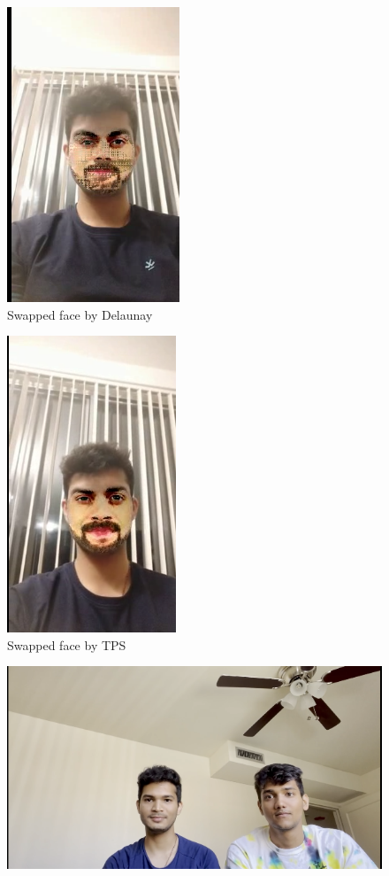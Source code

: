 \documentclass[conference]{IEEEtran}
\begin{document}
\begin{enumerate}
\begin{figure}[H]
\includegraphics[scale=0.4]{dt11.png}
\centering
\caption{Swapped face by Delaunay}
\end{figure}
\begin{figure}[H]
\includegraphics[scale=0.4]{tps1.png}
\centering
\caption{Swapped face by TPS}
\end{figure}
\begin{figure}[H]
\includegraphics[scale=0.4]{tps2.png}

\end{figure}
\end{enumerate}
\end{document}

